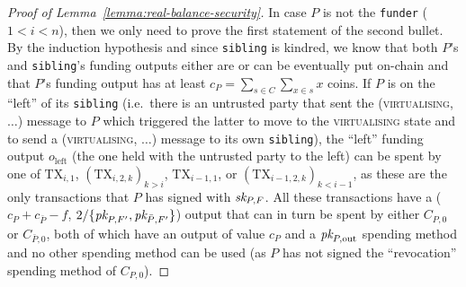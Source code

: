 \begin{proof}[Proof of Lemma~\ref{lemma:real-balance-security}]
  In case $P$ is not the \texttt{funder} ($1<i<n$), then we only need to prove
  the first statement of the second bullet. By the induction hypothesis and
  since \texttt{sibling} is kindred, we know that both $P$'s and
  \texttt{sibling}'s funding outputs either are or can be eventually put
  on-chain and that $P$'s funding output has at least $c_P = \sum\limits_{s \in
  C} \sum\limits_{x \in s} x$ coins. If $P$ is on the ``left'' of its
  \texttt{sibling} (i.e.\ there is an untrusted party that sent the
  (\textsc{virtualising}, $\dots$) message to $P$ which triggered the latter to
  move to the \textsc{virtualising} state and to send a (\textsc{virtualising},
  $\dots$) message to its own \texttt{sibling}), the ``left'' funding output
  $o_{\mathrm{left}}$ (the one held with the untrusted party to the left) can be
  spent by one of $\mathrm{TX}_{i, 1}$, $(\mathrm{TX}_{i, 2, k})_{k > i}$,
  $\mathrm{TX}_{i-1, 1}$, or $(\mathrm{TX}_{i-1, 2, k})_{k < i-1}$, as these are
  the only transactions that $P$ has signed with $\textit{sk}_{P, F}$. All these
  transactions have a ($c_P + c_{\bar{P}} - f$, $2/\{\textit{pk}_{P, F'}, \textit{pk}_{\bar{P},
  F'}\}$) output that can in turn be spent by either $C_{P, 0}$ or $C_{\bar{P},
  0}$, both of which have an output of value $c_P$ and a $\textit{pk}_{P, \mathrm{out}}$
  spending method and no other spending method can be used (as $P$ has not
  signed the ``revocation'' spending method of $C_{P, 0}$).


\end{proof}

